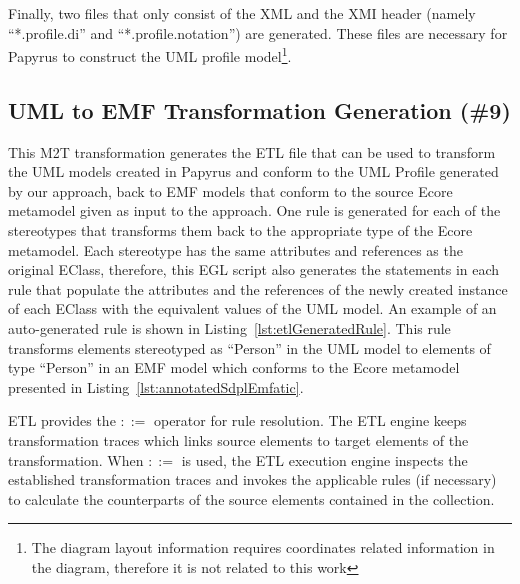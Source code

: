 Finally, two files that only consist of the XML and the XMI header (namely ``*.profile.di'' and ``*.profile.notation'') are generated. 
These files are necessary for Papyrus to construct the UML profile model\footnote{The diagram layout information requires coordinates related information in the diagram, therefore it is not related to this work}. 

\subsection{UML to EMF Transformation Generation (\#9)}
\label{sec:uml2emf}


This M2T transformation generates the ETL file that can be used to transform the UML models created in Papyrus and conform to the UML Profile generated by our approach, back to EMF models that conform to the source Ecore metamodel given as input to the approach. 
One rule is generated for each of the stereotypes that transforms them back to the appropriate type of the Ecore metamodel. 
Each stereotype has the same attributes and references as the original EClass, therefore, this EGL script also generates the statements in each rule that populate the attributes and the references of the newly created instance of each EClass with the equivalent values of the UML model. 
An example of an auto-generated rule is shown in Listing~\ref{lst:etlGeneratedRule}. 
This rule transforms elements stereotyped as ``Person'' in the UML model to elements of type ``Person'' in an EMF model which conforms to the Ecore metamodel presented in Listing~\ref{lst:annotatedSdplEmfatic}.



ETL provides the $::=$ operator for rule resolution. 
The ETL engine keeps transformation traces which links source elements to target elements of the transformation. 
When $::=$ is used, the ETL execution engine inspects the established transformation traces and invokes the applicable rules (if necessary) to calculate the counterparts of the source elements contained in the collection. 

